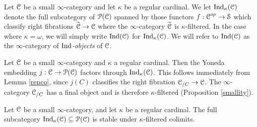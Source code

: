 \begin{definition}\label{indsmall}
Let $\operatorname{\mathcal{C}}$ be a small $\infty$-category and let $\kappa$ be a regular cardinal. 
We let $\operatorname{Ind}_{\kappa}(\operatorname{\mathcal{C}})$ denote the full subcategory of $\operatorname{\mathcal{P}}(\operatorname{\mathcal{C}})$ spanned by those functors $f: \operatorname{\mathcal{C}}^{op} \rightarrow \operatorname{\mathcal{S}}$ which classify right fibrations
$\widetilde{\operatorname{\mathcal{C}}} \rightarrow \operatorname{\mathcal{C}}$ where the $\infty$-category
$\widetilde{\operatorname{\mathcal{C}}}$ is $\kappa$-filtered. In the case where $\kappa = \omega$, we will simply write $\operatorname{Ind}(\operatorname{\mathcal{C}})$ for $\operatorname{Ind}_{\kappa}(\operatorname{\mathcal{C}})$. We will refer to $\operatorname{Ind}(\operatorname{\mathcal{C}})$ as the $\infty$-category of {\it $\operatorname{Ind}$-objects} of $\operatorname{\mathcal{C}}$.
\end{definition}

\begin{remark}\label{repareind}
Let $\operatorname{\mathcal{C}}$ be a small $\infty$-category and $\kappa$ a regular cardinal. Then the Yoneda embedding $j: \operatorname{\mathcal{C}} \rightarrow \operatorname{\mathcal{P}}(\operatorname{\mathcal{C}})$ factors through $\operatorname{Ind}_{\kappa}(\operatorname{\mathcal{C}})$. This follows immediately from Lemma \ref{repco}, since $j(C)$ classifies the right fibration $\operatorname{\mathcal{C}}_{/C} \rightarrow \operatorname{\mathcal{C}}$. The $\infty$-category $\operatorname{\mathcal{C}}_{/C}$ has a final object and is therefore $\kappa$-filtered (Proposition \ref{smallity}).
\end{remark}

\begin{proposition}\label{geort}
Let $\operatorname{\mathcal{C}}$ be a small $\infty$-category, and let $\kappa$ be a regular cardinal.
The full subcategory $\operatorname{Ind}_{\kappa}(\operatorname{\mathcal{C}}) \subseteq \operatorname{\mathcal{P}}(\operatorname{\mathcal{C}})$ is stable under $\kappa$-filtered colimits.
\end{proposition}

